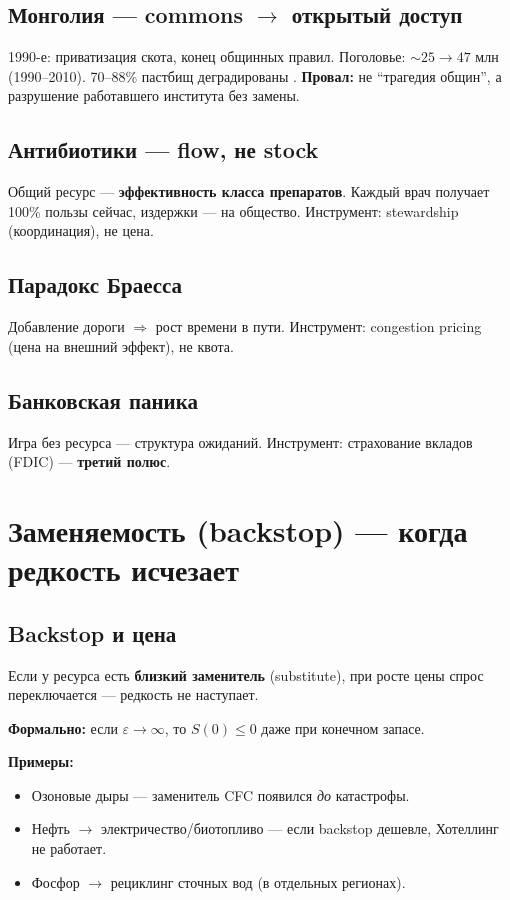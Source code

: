 \documentclass[12pt]{article}
\begin{document}
\subsection{Монголия --- commons $\to$ открытый доступ}
1990-е: приватизация скота, конец общинных правил. Поголовье: $\sim 25 \to 47$ млн (1990--2010). 70--88\% пастбищ деградированы \cite{worldbank2022mongolia}. \textbf{Провал:} не ``трагедия общин'', а разрушение работавшего института без замены.

\subsection{Антибиотики --- flow, не stock}
Общий ресурс --- \textbf{эффективность класса препаратов}. Каждый врач получает 100\% пользы сейчас, издержки --- на общество. Инструмент: stewardship (координация), не цена.

\subsection{Парадокс Браесса}
Добавление дороги $\Rightarrow$ рост времени в пути. Инструмент: congestion pricing (цена на внешний эффект), не квота.

\subsection{Банковская паника}
Игра без ресурса --- структура ожиданий. Инструмент: страхование вкладов (FDIC) --- \textbf{третий полюс}.

\section{Заменяемость (backstop) --- когда редкость исчезает}

\subsection{Backstop и цена}
Если у ресурса есть \textbf{близкий заменитель} (substitute), при росте цены спрос переключается --- редкость не наступает.

\textbf{Формально:} если $\varepsilon \to \infty$, то $S(0) \le 0$ даже при конечном запасе.

\textbf{Примеры:}
\begin{itemize}
\item Озоновые дыры --- заменитель CFC появился \emph{до} катастрофы.
\item Нефть $\to$ электричество/биотопливо --- если backstop дешевле, Хотеллинг не работает.
\item Фосфор $\to$ рециклинг сточных вод (в отдельных регионах).
\end{itemize}
\end{document}
